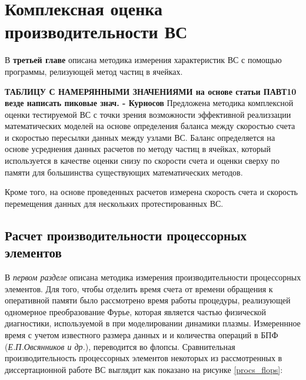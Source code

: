 \chapter{Комплексная оценка производительности ВС}
В \textbf{третьей главе} описана методика измерения характеристик ВС с помощью программы, релизующей метод частиц в ячейках.


\textbf{ТАБЛИЦУ С НАМЕРЯННЫМИ ЗНАЧЕНИЯМИ на основе статьи ПАВТ10
везде написать пиковые знач. - Курносов 
}
Предложена методика комплексной оценки тестируемой ВС с точки зрения возможности эффективной реализзации математических моделей на основе определения баланса между скоростью счета и скоростью пересылки данных между узлами ВС. Баланс определяется на основе усреднения данных расчетов по методу частиц в ячейках, который используется в качестве оценки снизу по скорости счета и оценки сверху по памяти для большинства существующих математических методов.

Кроме того, на основе проведенных расчетов измерена скорость счета и скорость перемещения данных для нескольких протестированных ВС.   






\section{Расчет производительности процессорных элементов}
\label{calc_PE}
В \textit{первом разделе} описана методика измерения производительности процессорных элементов.
Для того, чтобы отделить время счета от времени обращения к оперативной памяти было рассмотрено время работы процедуры,
реализующей одномерное преобразование Фурье, которая является частью физической диагностики, используемой в при моделировании динамики плазмы. Измереннное время с учетом известного размера данных и и количества операций в БПФ (\textit{Е.П.Овсянников и др.}), переводится во флопсы. Сравнительная производительность процессорных элементов некоторых из рассмотренных в диссертационной работе ВС выглядит как показано на рисунке  \ref{procs_flops}:

